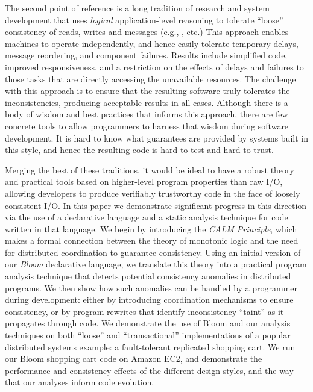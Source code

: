 The second point of reference is a long tradition of research and system development that uses {\em logical} application-level reasoning to tolerate ``loose'' consistency of reads, writes and messages (e.g., \cite{sagas,base,acid20,quicksand}, etc.)  This approach enables machines to operate independently, and hence easily tolerate temporary delays, message reordering, and component failures.  Results include simplified code, improved responsiveness, and a restriction on the effects of delays and failures to those tasks that are directly accessing the unavailable resources.  The challenge with this approach is to ensure that the resulting software truly tolerates the inconsistencies, producing acceptable results in all cases.  Although there is a body of wisdom and best practices that informs this approach, there are few concrete tools to allow programmers to harness that wisdom during software development.  It is hard to know what guarantees are provided by systems built in this style, and hence the resulting code is hard to test and hard to trust.  

Merging the best of these traditions, it would be ideal to have a robust theory and practical tools based on higher-level program properties than raw I/O, allowing developers to produce verifiably trustworthy code in the face of loosely consistent I/O.  In this paper we demonstrate significant progress in this direction via the use of a declarative language and a static analysis technique for code written in that language.  We begin by introducing the \emph{CALM Principle}, which makes a formal connection between the theory of monotonic logic and the need for distributed coordination to guarantee consistency.  Using an initial version of our {\em Bloom} declarative language, we translate this theory into a practical program analysis technique that detects potential consistency anomalies in distributed programs.  We then show how such anomalies can be handled by a programmer during development: either by introducing coordination mechanisms to ensure consistency, or by program rewrites that identify inconsistency ``taint'' as it propagates through code.  We demonstrate the use of Bloom and our analysis techniques on both ``loose'' and ``transactional'' implementations of a popular distributed systems example: a fault-tolerant replicated shopping cart.  We run our Bloom shopping cart code on Amazon EC2, and demonstrate the performance and consistency effects of the different design styles, and the way that our analyses inform code evolution.

